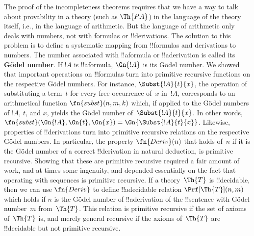 The proof of the incompleteness theorems requires that we have a way
to talk about provability in a theory (such as $\Th{PA}$) in the
language of the theory itself, i.e., in the language of
arithmetic. But the language of arithmetic only deals with numbers,
not with formulas or !!{derivation}s.  The solution to this problem is
to define a systematic mapping from !!{formula}s and derivations to
numbers. The number associated with !!a{formula} or !!a{derivation}
is called its \textbf{G\"odel number}.  If $!A$ is !!a{formula},
$\Gn{!A}$ is its G\"odel number. We showed that important operations on
!!{formula}s turn into primitive
recursive functions on the respective G\"odel
numbers. For instance, $\Subst{!A}{t}{x}$, the operation of
substituting a term~$t$ for every free occurrence of~$x$ in~$!A$,
corresponds to an arithmetical function $\fn{subst}(n,m,k)$ which, if
applied to the G\"odel numbers of $!A$, $t$, and $x$, yields the
G\"odel number of~$\Subst{!A}{t}{x}$. In other words,
$\fn{subst}(\Gn{!A}, \Gn{t}, \Gn{x}) = \Gn{\Subst{!A}{t}{x}}$.
Likewise, properties of !!{derivation}s
turn into primitive recursive relations on the respective G\"odel
numbers.  In particular, the property $\fn{Deriv}(n)$ that holds
of~$n$ if it is the G\"odel number of a correct !!{derivation} in
natural deduction, is primitive recursive.  Showing that these are
primitive recursive required a fair amount of work, and at times some
ingenuity, and depended essentially on the fact that operating with
sequences is primitive recursive.  If a theory~$\Th{T}$ is
!!{decidable}, then we can use $\fn{Deriv}$ to define !!a{decidable}
relation $\Prf[\Th{T}](n, m)$ which holds if $n$ is the G\"odel number
of !!a{derivation} of the !!{sentence} with G\"odel number~$m$
from~$\Th{T}$.  This relation is primitive recursive if the set of
axioms of~$\Th{T}$ is, and merely general recursive if the axioms
of~$\Th{T}$ are !!{decidable} but not primitive recursive.
